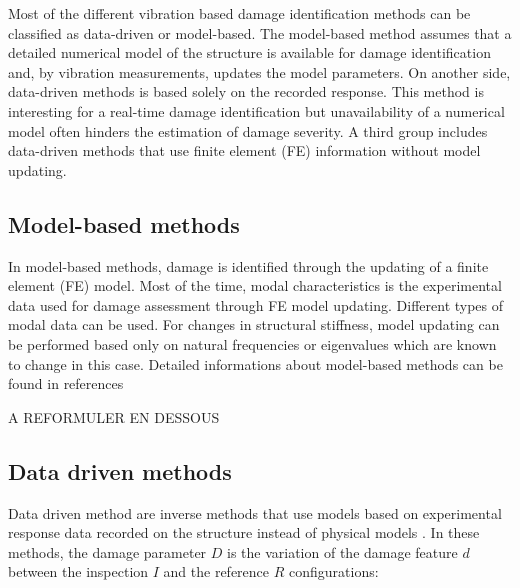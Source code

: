 \documentclass[journal]{IEEEtran}
\begin{document}
Most of the different vibration based damage identification methods can be classified as data-driven or model-based.
 The model-based method assumes that a detailed numerical model of the structure is available for damage identification and, by vibration measurements, updates the model parameters.
 On another side, data-driven methods is based solely on the recorded response. This method is interesting for a real-time damage identification but unavailability of a numerical model often hinders the estimation of damage severity.
 A third group includes data-driven methods that use finite element (FE) information without model updating.

\subsection{Model-based methods}  

In model-based methods, damage is identified through the updating of a finite element (FE) model.
 Most of the time, modal characteristics is the experimental data used for damage assessment through FE model updating.%
 Different types of modal data can be used. For changes in structural stiffness, model updating can be performed based only on natural frequencies or eigenvalues which are known to change in this case.
 Detailed informations about model-based methods can be found in references  %
\cite{fritzen1998damage}
\cite{teughels2005damage}
\cite{simoen2015dealing}

A REFORMULER EN DESSOUS

\subsection{Data driven methods}

Data driven method are inverse methods that use models based on experimental response data recorded on the structure instead of physical models
\cite{limongelli2016towards}.
 In these methods, the damage parameter $D$ is the variation of the damage feature $d$ between the inspection $I$ and the reference $R$ configurations: %
\end{document}
